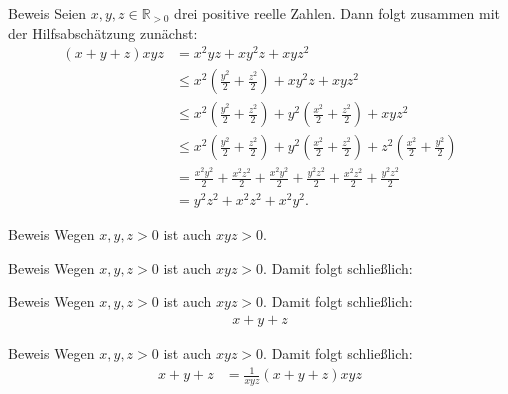 \documentclass[10pt]{beamer}
\def\bR{\mathbb{R}}
\begin{document}
\begin{frame}{Beweis}
    Seien \( x, y, z \in \bR_{> 0} \) drei positive reelle Zahlen. Dann folgt zusammen mit der Hilfsabschätzung zunächst:
    \begin{align*}
        \left( x + y + z \right)xyz
        & = x^{2}yz + xy^{2}z + xyz^{2} \\
        & \leq x^{2} \left( \frac{y^{2}}{2} + \frac{z^{2}}{2} \right) + xy^{2}z + xyz^{2} \\
        & \leq x^{2} \left( \frac{y^{2}}{2} + \frac{z^{2}}{2} \right) + y^{2} \left( \frac{x^{2}}{2} + \frac{z^{2}}{2} \right) + xyz^{2} \\
        & \leq x^{2} \left( \frac{y^{2}}{2} + \frac{z^{2}}{2} \right) + y^{2} \left( \frac{x^{2}}{2} + \frac{z^{2}}{2} \right) + z^{2} \left( \frac{x^{2}}{2} + \frac{y^{2}}{2} \right) \\
        & = \frac{x^{2}y^{2}}{2} + \frac{x^{2}z^{2}}{2} + \frac{x^{2}y^{2}}{2} + \frac{y^{2}z^{2}}{2} + \frac{x^{2}z^{2}}{2} + \frac{y^{2}z^{2}}{2} \\
        & = y^{2}z^{2} + x^{2}z^{2} + x^{2}y^{2}.
    \end{align*}
\end{frame}



\begin{frame}{Beweis}
    Wegen \( x, y, z > 0 \) ist auch \( xyz > 0 \).    
\end{frame}



\begin{frame}{Beweis}
    Wegen \( x, y, z > 0 \) ist auch \( xyz > 0 \). Damit folgt schließlich:    
\end{frame}



\begin{frame}{Beweis}
    Wegen \( x, y, z > 0 \) ist auch \( xyz > 0 \). Damit folgt schließlich:
    \begin{align*}
        x + y + z
    \end{align*}
\end{frame}



\begin{frame}{Beweis}
    Wegen \( x, y, z > 0 \) ist auch \( xyz > 0 \). Damit folgt schließlich:
    \begin{align*}
        x + y + z
        & = \frac{1}{xyz} \left( x + y + z \right) xyz
    \end{align*}
\end{frame}
\end{document}
